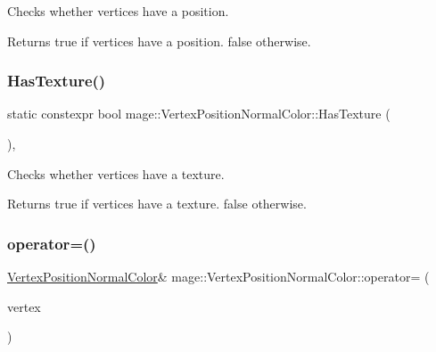 Checks whether vertices have a position.

\begin{DoxyReturn}{Returns}
{\ttfamily true} if vertices have a position. {\ttfamily false} otherwise. 
\end{DoxyReturn}
\hypertarget{structmage_1_1_vertex_position_normal_color_a9939ce4300e6dd0402abd299f55435ef}{}\label{structmage_1_1_vertex_position_normal_color_a9939ce4300e6dd0402abd299f55435ef} 
\subsubsection{\texorpdfstring{Has\+Texture()}{HasTexture()}}
{\footnotesize\ttfamily static constexpr bool mage\+::\+Vertex\+Position\+Normal\+Color\+::\+Has\+Texture (\begin{DoxyParamCaption}{ }\end{DoxyParamCaption})\hspace{0.3cm}{\ttfamily [static]}, {\ttfamily [noexcept]}}

Checks whether vertices have a texture.

\begin{DoxyReturn}{Returns}
{\ttfamily true} if vertices have a texture. {\ttfamily false} otherwise. 
\end{DoxyReturn}
\hypertarget{structmage_1_1_vertex_position_normal_color_aff39199b81977d3479976c83f7f51a4f}{}\label{structmage_1_1_vertex_position_normal_color_aff39199b81977d3479976c83f7f51a4f} 
\subsubsection{\texorpdfstring{operator=()}{operator=()}\hspace{0.1cm}{\footnotesize\ttfamily [1/2]}}
{\footnotesize\ttfamily \hyperlink{structmage_1_1_vertex_position_normal_color}{Vertex\+Position\+Normal\+Color}\& mage\+::\+Vertex\+Position\+Normal\+Color\+::operator= (\begin{DoxyParamCaption}\item[{const \hyperlink{structmage_1_1_vertex_position_normal_color}{Vertex\+Position\+Normal\+Color} \&}]{vertex }\end{DoxyParamCaption})\hspace{0.3cm}{\ttfamily [default]}}

